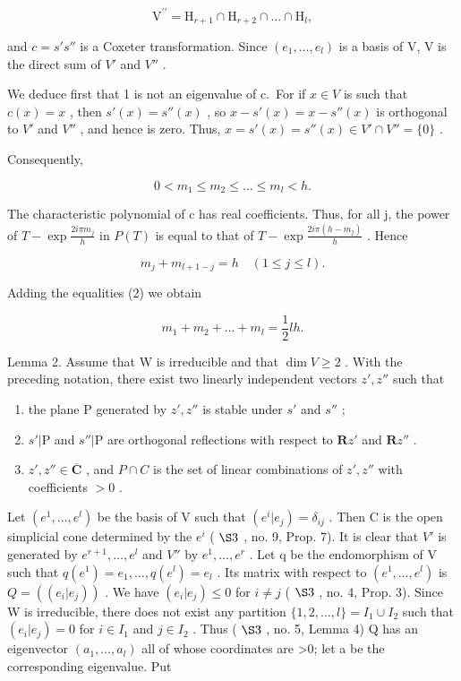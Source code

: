 \[
\mathrm{V} ^ {\prime \prime} = \mathrm{H} _ {r + 1} \cap \mathrm{H} _ {r + 2} \cap \dots \cap \mathrm{H} _ {l},
\]

and \(c = s's''\) is a Coxeter transformation. Since \((e_{1}, \ldots, e_{l})\) is a basis of V, V is the direct sum of \(V'\) and \(V''\) .

We deduce first that 1 is not an eigenvalue of c.~For if \(x \in V\) is such that \(c(x) = x\) , then \(s'(x) = s''(x)\) , so \(x - s'(x) = x - s''(x)\) is orthogonal to \(V'\) and \(V''\) , and hence is zero. Thus, \(x = s'(x) = s''(x) \in V' \cap V'' = \{0\}\) .

Consequently,

\[
0 <   m _ {1} \leqslant m _ {2} \leqslant \dots \leqslant m _ {l} <   h.\tag{1}
\]

The characteristic polynomial of c has real coefficients. Thus, for all j, the power of \(T - \exp\frac{2i\pi m_{j}}{h}\) in \(P(T)\) is equal to that of \(T - \exp\frac{2i\pi(h - m_{j})}{h}\) . Hence

\[
m _ {j} + m _ {l + 1 - j} = h \quad (1 \leqslant j \leqslant l).\tag{2}
\]

Adding the equalities (2) we obtain

\[
m _ {1} + m _ {2} + \dots + m _ {l} = \frac {1}{2} l h.\tag{3}
\]

Lemma 2. Assume that W is irreducible and that \(\dim V \geqslant 2\) . With the preceding notation, there exist two linearly independent vectors \(z', z''\) such that

\begin{enumerate}
\def\labelenumi{(\roman{enumi})}
\item
  the plane P generated by \(z', z''\) is stable under \(s'\) and \(s''\) ;
\item
  \(s'|\mathrm{P}\) and \(s''|\mathrm{P}\) are orthogonal reflections with respect to \(\mathbf{R}z'\) and \(\mathbf{R}z''\) .
\item
  \(z', z'' \in \overline{\mathbf{C}}\) , and \(P \cap C\) is the set of linear combinations of \(z', z''\) with coefficients \(> 0\) .
\end{enumerate}

Let \((e^{1},\ldots,e^{l})\) be the basis of V such that \((e^{i}|e_{j})=\delta_{ij}\) . Then C is the open simplicial cone determined by the \(e^{i}\) ( \(\S 3\) , no. 9, Prop. 7). It is clear that \(V'\) is generated by \(e^{r+1},\ldots,e^{l}\) and \(V''\) by \(e^{1},\ldots,e^{r}\) . Let q be the endomorphism of V such that \(q(e^{1})=e_{1},\ldots,q(e^{l})=e_{l}\) . Its matrix with respect to \((e^{1},\ldots,e^{l})\) is \(Q=((e_{i}|e_{j}))\) . We have \((e_{i}|e_{j})\leqslant0\) for \(i\neq j\) ( \(\S 3\) , no. 4, Prop. 3). Since W is irreducible, there does not exist any partition \(\{1,2,\ldots,l\}=I_{1}\cup I_{2}\) such that \((e_{i}|e_{j})=0\) for \(i\in I_{1}\) and \(j\in I_{2}\) . Thus ( \(\S 3\) , no. 5, Lemma 4) Q has an eigenvector \((a_{1},\ldots,a_{l})\) all of whose coordinates are \textgreater0; let a be the corresponding eigenvalue. Put

